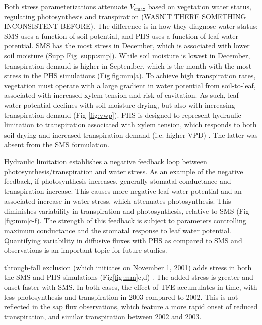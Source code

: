 \documentclass[draft,linenumbers]{agujournal}
\begin{document}
    Both stress parameterizations attenuate $V_{\text{cmax}}$ based on vegetation water status, regulating photosynthesis and transpiration (WASN'T THERE SOMETHING INCONSISTENT BEFORE).
    The difference is in how they diagnose water status: SMS uses a function of soil potential, and PHS uses a function of leaf water potential.
    SMS has the most stress in December, which is associated with lower soil moisture (Supp Fig \ref{supp:smp}).
    While soil moisture is lowest in December, transpiration demand is higher in September,
    which is the month with the most stress in the PHS simulations (Fig\ref{fig:mm}a).
    To achieve high transpiration rates, vegetation must operate with a large gradient in water potential from soil-to-leaf, associated with increased xylem tension and risk of cavitation.
    As such, leaf water potential declines with soil moisture drying, but also with increasing transpiration demand (Fig \ref{fig:vwp}).
    PHS is designed to represent hydraulic limitation to transpiration associated with xylem tension, which responds to both soil drying and increased transpiration demand (i.e. higher VPD) \citep{sperry2015}. The latter was absent from the SMS formulation.
    
    Hydraulic limitation establishes a negative feedback loop between photosynthesis/transpiration and water stress.
    As an example of the negative feedback, if photosynthesis increases, generally stomatal conductance and transpiration increase.
    This causes more negative leaf water potential and an associated increase in water stress, which attenuates photosynthesis.
    This diminishes variability in transpiration and photosynthesis, relative to SMS (Fig \ref{fig:mm}c-f).
    The strength of this feedback is subject to parameters controlling maximum conductance and the stomatal response to leaf water potential.
    Quantifying variability in diffusive fluxes with PHS as compared to SMS and observations is an important topic for future studies.
    
    through-fall exclusion (which initiates on November 1, 2001) adds stress in both the SMS and PHS simulations (Fig\ref{fig:mm}c,d) .
    The added stress is greater and onset faster with SMS.
    In both cases, the effect of TFE accumulates in time, with less photosynthesis and transpiration in 2003 compared to 2002.
    This is not reflected in the sap flux observations, which feature a more rapid onset of reduced transpiration, and similar transpiration between 2002 and 2003.
    
\end{document}
